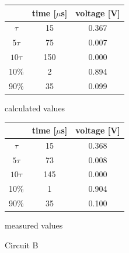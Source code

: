 \documentclass[notitlepage, a4paper, 11pt]{article}
\begin{document}
	\begin{figure}[H]
		\centering
		\begin{subtable}{0.45\textwidth}
			\centering
			\begin{tabular}{|c|c|c|}
				\hline
				& time [$\mu$s] & voltage [V] \\
				\hline
				$\tau$ & 15 & 0.367 \\
				\hline		
				$5\tau$ & 75 & 0.007 \\
				\hline
				$10\tau$ & 150 & 0.000 \\
				\hline
				10\% & 2 & 0.894 \\
				\hline
				90\% & 35 & 0.099 \\
				\hline
			\end{tabular}
			\caption{calculated values}
		\end{subtable}
		\hfill
		\begin{subtable}{0.45\textwidth}
			\centering
			\begin{tabular}{|c|c|c|}
				\hline
				& time [$\mu$s] & voltage [V] \\
				\hline
				$\tau$ & 15 & 0.368 \\
				\hline		
				$5\tau$ & 73 & 0.008 \\
				\hline
				$10\tau$ & 145 & 0.000 \\
				\hline
				10\% & 1 & 0.904 \\
				\hline
				90\% & 35 & 0.100 \\
				\hline
			\end{tabular}
			\caption{measured values}
		\end{subtable}
		\caption{Circuit B}
	\end{figure}
	
\end{document}
